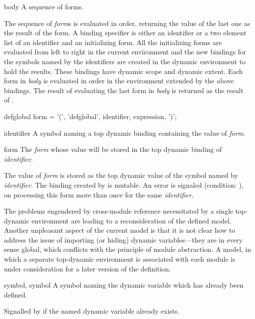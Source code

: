 \begin{optDefinition}
\begin{arguments}
    \item[body] A sequence of forms.
\end{arguments}
%
\result%
The sequence of {\em form}s is evaluated in order, returning the value of the
last one as the result of the  form.
%
\remarks%
A binding specifier is either an identifier or a two element list of an
identifier and an initializing form.  All the initializing forms are evaluated
from left to right in the current environment and the new bindings for the
symbols named by the identifiers are created in the dynamic environment to hold
the results.  These bindings have dynamic scope and dynamic
extent.
Each form in {\em body} is evaluated in order in the environment extended by the
above bindings.  The result of evaluating the last form in {\em body} is
returned as the result of .

%
\Syntax
\savesyntax{}\vbox{\small\syntax
defglobal form
   = '(', 'defglobal', identifier, expression, ')';
\endsyntax}
%
\begin{arguments}
    \item[identifier] A symbol naming a top dynamic binding containing the value
    of {\em form}.

    \item[form] The {\em form} whose value will be stored in the top dynamic
    binding of {\em identifier}.
\end{arguments}
%
\remarks%
The value of {\em form} is stored as the top dynamic value of the symbol named
by {\em identifier}.  The binding created by
 is mutable.  An error is signaled (condition:
),
on processing this form more than once for the same {\em identifier}.
%
\begin{note}
    The problems engendered by cross-module reference necessitated by a single
    top-dynamic environment are leading to a reconsideration of the defined
    model.  Another unpleasant aspect of the current model is that it is not
    clear how to address the issue of importing (or hiding) dynamic
    variables---they are in every sense global, which conflicts with the
    principle of module abstraction.  A model, in which a separate top-dynamic
    environment is associated with each module is under consideration for a
    later version of the definition.
\end{note}

%
\begin{initoptions}
    \item[symbol, symbol] A symbol naming the dynamic variable which has already
    been defined.
\end{initoptions}
%
\remarks%
Signalled by  if the named dynamic variable already
exists.
\end{optDefinition}

